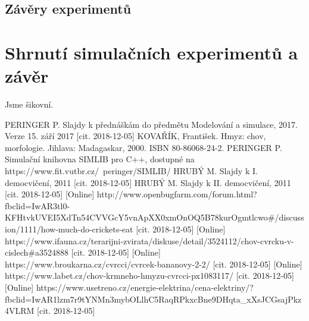\documentclass[11pt, a4paper, titlepage]{article}
\begin{document}
    \subsection{Závěry experimentů}

    \section{Shrnutí simulačních experimentů a závěr}
    Jsme šikovní.

    \begin{thebibliography}{zdroje}
         \label{ims} PERINGER P. Slajdy k přednáškám do předmětu Modelování a simulace, 2017. Verze 15. září 2017 [cit. 2018-12-05]
         \label{kniha} KOVAŘÍK, František. Hmyz: chov, morfologie. Jihlava: Madagaskar, 2000. ISBN 80-86068-24-2.
         \label{simlib} PERINGER P. Simulační knihovna SIMLIB pro C++, dostupné na https://www.fit.vutbr.cz/~peringer/SIMLIB/
         \label{prvnidemo} HRUBÝ M. Slajdy k I. democvičení, 2011 [cit. 2018-12-05]
         \label{druhedemo} HRUBÝ M. Slajdy k II. democvičení, 2011 [cit. 2018-12-05]
         \label{jidlo} [Online] http://www.openbugfarm.com/forum.html?fbclid=IwAR3tl0-KFHtvkUVEI5XdTn54CVVGcY5vnApXX0xmOnOQ5B78kurOgmtlcwo\#/discussion/1111/how-much-do-crickets-eat [cit. 2018-12-05]
         \label{forum} [Online] https://www.ifauna.cz/terarijni-zvirata/diskuse/detail/3524112/chov-cvrcku-v-cislech\#a3524888 [cit. 2018-12-05]
         \label{cena} [Online] https://www.broukarna.cz/cvrcci/cvrcek-bananovy-2-2/ [cit. 2018-12-05]
         \label{topeni} [Online] https://www.labet.cz/chov-krmneho-hmyzu-cvrcci-px1083117/ [cit. 2018-12-05]
         \label{cena_topeni} [Online] https://www.usetreno.cz/energie-elektrina/cena-elektriny/?fbclid=IwAR1lzm7r9tYNMn3mybOLlhC5RaqRPkxcBne9DHqta_xXsJCGsajPkz4VLRM [cit. 2018-12-05]
    \end{thebibliography}
\end{document}
